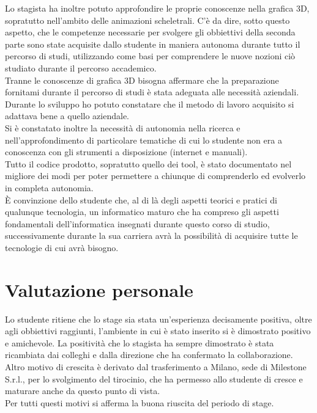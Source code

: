 Lo stagista ha inoltre potuto approfondire le proprie conoscenze nella grafica 3D, sopratutto nell'ambito delle animazioni scheletrali. C'è da dire, sotto questo aspetto, che le competenze necessarie per svolgere gli obbiettivi della seconda parte sono state acquisite dallo studente in maniera autonoma durante tutto il percorso di studi, utilizzando come basi per comprendere le nuove nozioni ciò studiato durante il percorso accademico.\\

Tranne le conoscenze di grafica 3D bisogna affermare che la preparazione fornitami durante il percorso di studi è stata adeguata alle necessità aziendali. Durante lo sviluppo ho potuto constatare che il metodo di lavoro acquisito si adattava bene a quello aziendale.\\

Si è constatato inoltre la necessità di autonomia nella ricerca e nell'approfondimento di particolare tematiche di cui lo studente non era a conoscenza con gli strumenti a disposizione (internet e manuali).\\

Tutto il codice prodotto, sopratutto quello dei tool, è stato documentato nel migliore dei modi per poter permettere a chiunque di comprenderlo ed evolverlo in completa autonomia.\\

È convinzione dello studente che, al di là degli aspetti teorici e pratici di qualunque tecnologia, un informatico maturo che ha compreso gli aspetti fondamentali dell'informatica insegnati durante questo corso di studio, successivamente durante la sua carriera avrà la possibilità di acquisire tutte le tecnologie di cui avrà bisogno.

\section{Valutazione personale}

Lo studente ritiene che lo stage sia stata un'esperienza decisamente positiva, oltre agli obbiettivi raggiunti, l'ambiente in cui è stato inserito si è dimostrato positivo e amichevole. La positività che lo stagista ha sempre dimostrato è stata ricambiata dai colleghi e dalla direzione che ha confermato la collaborazione. Altro motivo di crescita è derivato dal trasferimento a Milano, sede di Milestone S.r.l., per lo svolgimento del tirocinio, che ha permesso allo studente di cresce e maturare anche da questo punto di vista.\\

Per tutti questi motivi si afferma la buona riuscita del periodo di stage.
